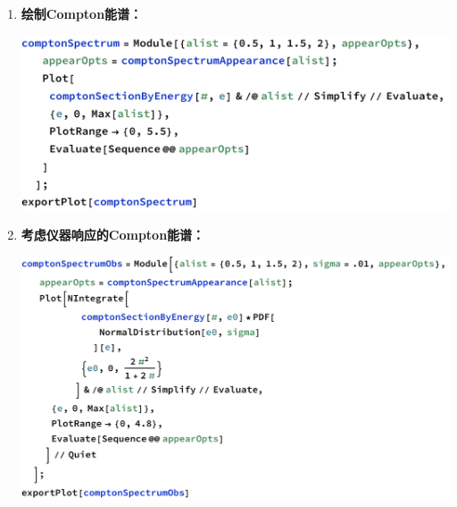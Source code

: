 \documentclass[aps,pre,12pt,preprint,%
	onecolumn,showpacs,showkeys,nofootinbib]{revtex4-1}
\begin{document}
\begin{enumerate}
	\item \textbf{绘制Compton能谱：}\par\vspace{1ex}
	\qquad\qquad\includegraphics[scale=.6]{data/comptonSpectrumCode.pdf}
	\item \textbf{考虑仪器响应的Compton能谱：}\par\vspace{1ex}
	\qquad\qquad\includegraphics[scale=.6]{data/comptonSpectrumObsCode.pdf}
	\end{enumerate}
\clearpage
\end{document}
